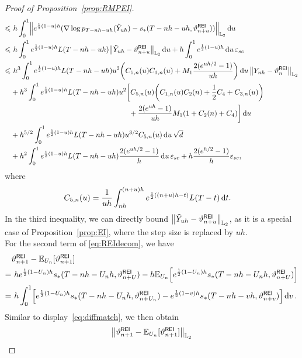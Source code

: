 \begin{proof}[Proof of Proposition~\ref{prop:RMPEI}]
\begin{align*}
    \leqslant &\,\, h\int_0^1\left\lVert e^{\frac{1}{2}(1-u)h}(\nabla\log p_{T-nh-uh}(\tilde{Y}_{uh})-s_*(T-nh-uh,\vartheta_{n+u}^{\sf REI}))\right\rVert_{\Ltwo}\rmd u\\
    \leqslant & \,\,h\int_0^1e^{\frac{1}{2}(1-u)h}L(T-nh-uh)\l|\tilde{Y}_{uh}-\vartheta_{n+u}^{\sf REI}\r|_{\Ltwo}\rmd u+h\int_0^1e^{\frac{1}{2}(1-u)h}\rmd u\,\varepsilon_{sc}\\
    \leqslant & \,\,h^3\int_0^1e^{\frac{1}{2}(1-u)h}L(T-nh-uh)u^2\left( C_{5,n}(u)C_{1,n}(u)+M_1\dfrac{2(e^{uh/2}-1)}{uh}\right)\rmd u\,\l|Y_{nh}-\vartheta_n^{\sf REI}\r|_{\Ltwo}\\
    & +h^3\int_0^1e^{\frac{1}{2}(1-u)h}L(T-nh-uh)u^2\bigg[C_{5,n}(u)\left(C_{1,n}(u)C_2(n)+\dfrac{1}{2}C_4+C_{3,n}(u)\right)\\
    & \qquad\qquad\qquad\qquad\qquad\qquad\qquad\qquad+\dfrac{2(e^{uh}-1)}{uh}M_1(1+C_2(n)+C_4)\bigg]\rmd u\\
    &+h^{5/2}\int_0^1e^{\frac{1}{2}(1-u)h}L(T-nh-uh)u^{3/2}C_{5,n}(u)\rmd u\,\sqrt{d}\\
    & +h^2\int_0^1e^{\frac{1}{2}(1-u)h}L(T-nh-uh)\dfrac{2(e^{uh/2}-1)}{h}\rmd u\,\varepsilon_{sc}+h\dfrac{2(e^{h/2}-1)}{h}\varepsilon_{sc},
\end{align*}
where
\begin{align*}
    C_{5,n}(u)&=\dfrac{1}{uh}\int_{nh}^{(n+u)h}e^{\frac{1}{2}((n+u)h-t)}L(T-t){\,\rm d} t.
\end{align*}
In the third inequality, we can directly bound $\l|\tilde{Y}_{uh}-\vartheta_{n+u}^{\sf REI}\r|_{\Ltwo}$, as it is a special case of Proposition~\ref{prop:EI}, where the step size is replaced by $uh$.\\
For the second term of \eqref{eq:REIdecom}, we have
\begin{align*}
    &\vartheta_{n+1}^{\sf REI}-\mathbb{E}_{U_n}[\vartheta_{n+1}^{\sf REI}]\\
    =& \,\, he^{\frac{1}{2}(1-U_n)h}s_*(T-nh-U_nh,\vartheta_{n+U}^{\sf REI})-h\mathbb{E}_{U_n}\left[e^{\frac{1}{2}(1-U_n)h}s_*(T-nh-U_nh,\vartheta_{n+U}^{\sf REI})\right]\\
    =&\,\,h\int_0^1\left[e^{\frac{1}{2}(1-U_n)h}s_*(T-nh-U_nh,\vartheta_{n+U_n}^{\sf REI})-e^{\frac{1}{2}(1-v)h}s_*(T-nh-vh,\vartheta_{n+v}^{\sf REI})\right]\rmd v\,.
\end{align*}
Similar to display~\eqref{eq:diffmatch}, we then obtain
\begin{align*}
    &\left\lVert\vartheta_{n+1}^{\sf REI}-\mathbb{E}_{U_n}[\vartheta_{n+1}^{\sf REI}]\right\rVert_{\Ltwo}\\

\end{align*}
\end{proof}
